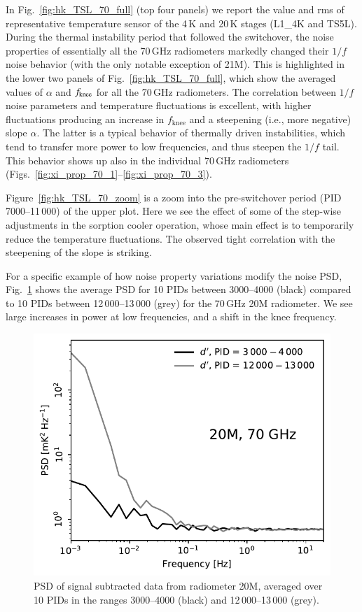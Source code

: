 \documentclass[twocolumn]{aa}
\begin{document}
In Fig.~\ref{fig:hk_TSL_70_full} (top four panels) we report the value and rms of 
representative temperature sensor of the 4\,K and 20\,K stages 
(L1\_4K and TS5L). During the thermal instability period 
that followed the switchover, the noise
properties of essentially all the 70\,GHz radiometers markedly changed
their $1/f$ noise behavior (with the only notable exception of
21M). This is highlighted in the lower two panels of
Fig.~\ref{fig:hk_TSL_70_full}, which show the averaged values of $\alpha$ and
$f_{\rm knee}$ for all the 70\,GHz radiometers. The correlation between $1/f$ noise parameters and
temperature fluctuations is excellent, with higher fluctuations producing an
increase in $f_{\mathrm{knee}}$ and a steepening (i.e., more negative)
slope $\alpha$. The latter is a typical behavior of thermally driven
instabilities, which tend to transfer more power to low frequencies,
and thus steepen the $1/f$ tail. This behavior shows up
also in the individual 70\,GHz radiometers
(Figs.~\ref{fig:xi_prop_70_1}--\ref{fig:xi_prop_70_3}).

Figure~\ref{fig:hk_TSL_70_zoom} is a zoom into the pre-switchover period
(PID 7000--11\,000) of the upper plot. Here we see the effect of some
of the step-wise adjustments in the sorption cooler operation, whose
main effect is to temporarily reduce the temperature fluctuations. The
observed tight correlation with the steepening of the slope is
striking.

For a specific example of how noise property variations modify the
noise PSD, Fig.~\ref{fig:ps_compare_sorption} shows the average PSD
for 10 PIDs between 3000--4000 (black) compared to 10 PIDs between
12\,000--13\,000 (grey) for the 70\,GHz 20M radiometer. We see large
increases in power at low frequencies, and a shift in the knee
frequency.

\begin{figure}
	\begin{center}
		\includegraphics[width=\linewidth]{figs/ps_running_mean_20M.pdf}
	\end{center}
	\caption{PSD of signal subtracted data from radiometer 20M, averaged over 10
		PIDs in the ranges 3000--4000 (black) and 12\,000--13\,000 (grey). 
		\label{fig:ps_compare_sorption}}
\end{figure}
\end{document}
